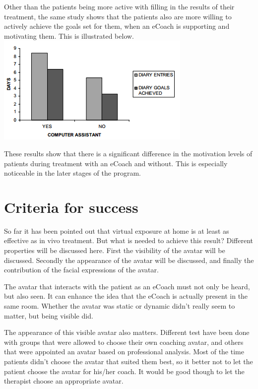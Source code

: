 \documentclass[twoside]{article}
\begin{document}
\begin{multicols}{2}
Other than the patients being more active with filling in the results of their treatment, the same study shows that the patients also are more willing to actively achieve the goals set for them, when an eCoach is supporting and motivating them. This is illustrated below.\\
\includegraphics[scale=0.7]{Graph2.png}

These results show that there is a significant difference in the motivation levels of patients during treatment with an eCoach and without. This is especially noticeable in the later stages of the program.


\section{Criteria for success}
So far it has been pointed out that virtual exposure at home is at least as effective as in vivo treatment. But what is needed to achieve this result? Different properties will be discussed here. First the visibility of the avatar will be discussed. Secondly the appearance of the avatar will be discussed, and finally the contribution of the facial expressions of the avatar.

The avatar that interacts with the patient as an eCoach must not only be heard, but also seen. It can enhance the idea that the eCoach is actually present in the same room. Whether the avatar was static or dynamic didn't really seem to matter, but being visible did.\cite{baylor2009promoting}

The appearance of this visible avatar also matters. Different test have been done with groups that were allowed to choose their own coaching avatar, and others that were appointed an avatar based on professional analysis. Most of the time patients didn't choose the avatar that suited them best, so it better not to let the patient choose the avatar for his/her coach. It would be good though to let the therapist choose an appropriate avatar.\cite{baylor2009promoting}


\end{multicols}
\end{document}
